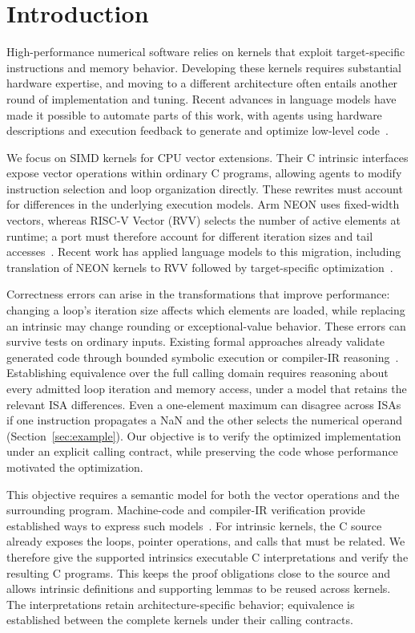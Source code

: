 \section{Introduction}
\label{sec:intro}

High-performance numerical software relies on kernels that exploit target-specific instructions and memory behavior. Developing these kernels requires substantial hardware expertise, and moving to a different architecture often entails another round of implementation and tuning. Recent advances in language models have made it possible to automate parts of this work, with agents using hardware descriptions and execution feedback to generate and optimize low-level code~\cite{kernelbench,autocomp}.

We focus on SIMD kernels for CPU vector extensions. Their C intrinsic interfaces expose vector operations within ordinary C programs, allowing agents to modify instruction selection and loop organization directly. These rewrites must account for differences in the underlying execution models. Arm NEON uses fixed-width vectors, whereas RISC-V Vector (RVV) selects the number of active elements at runtime; a port must therefore account for different iteration sizes and tail accesses~\cite{acle,rvv}. Recent work has applied language models to this migration, including translation of NEON kernels to RVV followed by target-specific optimization~\cite{saltyrn,intrintrans}.

Correctness errors can arise in the transformations that improve performance: changing a loop's iteration size affects which elements are loaded, while replacing an intrinsic may change rounding or exceptional-value behavior. These errors can survive tests on ordinary inputs. Existing formal approaches already validate generated code through bounded symbolic execution or compiler-IR reasoning~\cite{saltyrn,llm-vectorizer,alive2}. Establishing equivalence over the full calling domain requires reasoning about every admitted loop iteration and memory access, under a model that retains the relevant ISA differences. Even a one-element maximum can disagree across ISAs if one instruction propagates a NaN and the other selects the numerical operand (Section~\ref{sec:example}). Our objective is to verify the optimized implementation under an explicit calling contract, while preserving the code whose performance motivated the optimization.

This objective requires a semantic model for both the vector operations and the surrounding program. Machine-code and compiler-IR verification provide established ways to express such models~\cite{sail,islaris,alive2,rake}. For intrinsic kernels, the C source already exposes the loops, pointer operations, and calls that must be related. We therefore give the supported intrinsics executable C interpretations and verify the resulting C programs. This keeps the proof obligations close to the source and allows intrinsic definitions and supporting lemmas to be reused across kernels. The interpretations retain architecture-specific behavior; equivalence is established between the complete kernels under their calling contracts.

